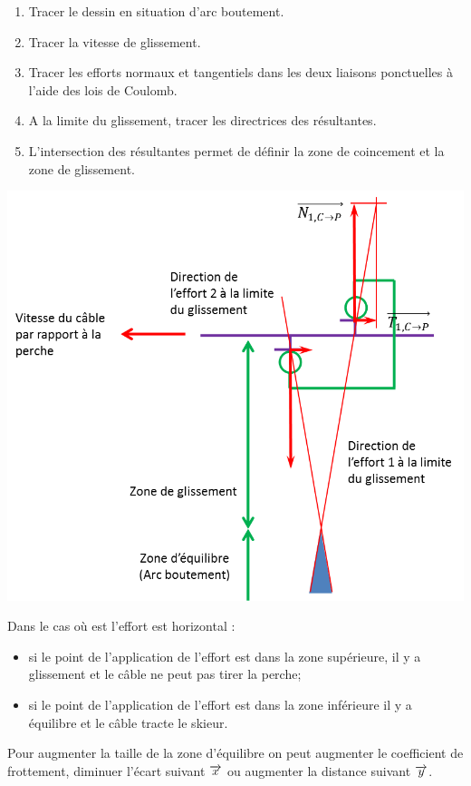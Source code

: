 \documentclass[10pt]{article}
\begin{document}
\begin{methode}
\begin{enumerate}
\item Tracer le dessin en situation d'arc boutement.
\item Tracer la vitesse de glissement.
\item Tracer les efforts normaux et tangentiels dans les deux liaisons ponctuelles à l'aide des lois de Coulomb.
\item A la limite du glissement, tracer les directrices des résultantes. 
\item L'intersection des résultantes permet de définir la zone de coincement et la zone de glissement. 
\end{enumerate}
\end{methode}

\begin{center}
\includegraphics[width=.7\textwidth]{images/arc3}
\end{center}

Dans le cas où est l'effort est horizontal :
\begin{itemize}
\item si le point de l'application de l'effort est dans la zone supérieure, il y a glissement et le câble ne peut pas tirer la perche;
\item si le point de l'application de l'effort est dans la zone inférieure il y a équilibre et le câble tracte le skieur. 
\end{itemize}

Pour augmenter la taille de la zone d'équilibre on peut augmenter le coefficient de frottement, diminuer l'écart suivant $\overrightarrow{x}$ ou augmenter la distance suivant $\overrightarrow{y}$.

\begin{thebibliography}{2}
\end{thebibliography}
\end{document}
